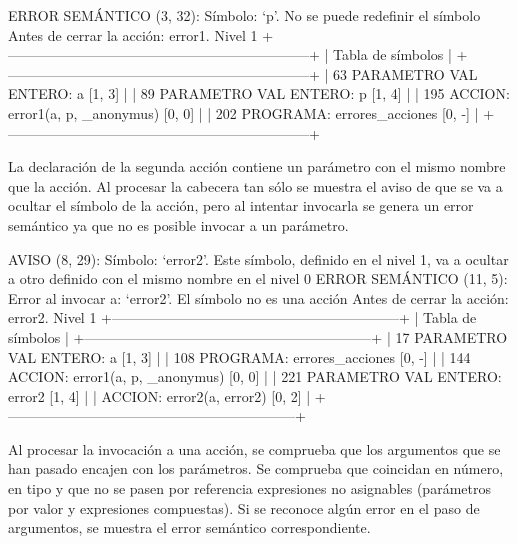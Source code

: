 \begin{codigo}
ERROR SEMÁNTICO (3, 32): Símbolo: `p'. No se puede redefinir el símbolo
Antes de cerrar la acción: error1. Nivel 1
+-----------------------------------------------------------------+
| Tabla de símbolos                                                      |
+-----------------------------------------------------------------+
|    63  PARAMETRO VAL ENTERO:     a [1, 3]                              |
|    89  PARAMETRO VAL ENTERO:     p [1, 4]                              |
|   195  ACCION:                   error1(a, p, _anonymus) [0, 0]        |
|   202  PROGRAMA:                 errores_acciones [0, -]               |
+-----------------------------------------------------------------+
\end{codigo}

La declaración de la segunda acción contiene un parámetro con el mismo nombre que la acción. Al procesar la cabecera tan sólo se muestra el aviso de que se va a ocultar el símbolo de la acción, pero al intentar invocarla se genera un error semántico ya que no es posible invocar a un parámetro.

\begin{codigo}
AVISO (8, 29): Símbolo: `error2'. Este símbolo, definido en el nivel 1, va a ocultar a otro definido con el mismo nombre en el nivel 0
ERROR SEMÁNTICO (11, 5): Error al invocar a: `error2'. El símbolo no es una acción
Antes de cerrar la acción: error2. Nivel 1
+--------------------------------------------------------------+
| Tabla de símbolos                                                   |
+--------------------------------------------------------------+
|    17  PARAMETRO VAL ENTERO:     a [1, 3]                           |
|   108  PROGRAMA:                 errores_acciones [0, -]            |
|   144  ACCION:                   error1(a, p, _anonymus) [0, 0]     |
|   221  PARAMETRO VAL ENTERO:     error2 [1, 4]                      |
|        ACCION:                   error2(a, error2) [0, 2]           |
+--------------------------------------------------------------+
\end{codigo}

Al procesar la invocación a una acción, se comprueba que los argumentos que se han pasado encajen con los parámetros. Se comprueba que coincidan en número, en tipo y que no se pasen por referencia expresiones no asignables (parámetros por valor y expresiones compuestas). Si se reconoce algún error en el paso de argumentos, se muestra el error semántico correspondiente.

